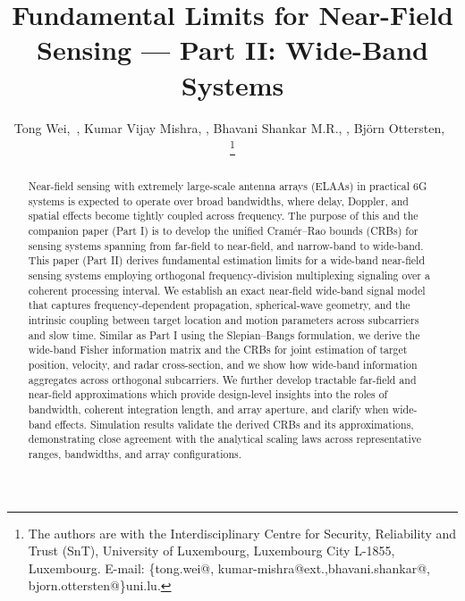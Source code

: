 \documentclass[9pt,final,journal,twocolumn]{IEEEtran}
\begin{document}
\title{Fundamental Limits for Near-Field Sensing --- Part II: Wide-Band Systems}

\author{Tong Wei,~, Kumar Vijay Mishra, , 
Bhavani Shankar M.R., , Björn Ottersten,~


\thanks{The authors are with the Interdisciplinary Centre for Security, Reliability and Trust (SnT), University of Luxembourg, Luxembourg City L-1855, Luxembourg. E-mail: \{tong.wei@, kumar-mishra@ext.,bhavani.shankar@, bjorn.ottersten@\}uni.lu.}
}

\maketitle 

\begin{abstract}
Near-field sensing with extremely large-scale antenna arrays (ELAAs) in practical 6G systems is expected to operate over broad bandwidths, where delay, Doppler, and spatial effects become tightly coupled across frequency. The purpose of this and the companion paper (Part I) is to develop the unified Cramér–Rao bounds (CRBs) for sensing systems spanning from far-field to near-field, and narrow-band to wide-band. This paper (Part II) derives fundamental estimation limits for a wide-band near-field sensing systems employing orthogonal frequency-division multiplexing signaling over a coherent processing interval. We establish an exact near-field wide-band signal model that captures frequency-dependent propagation, spherical-wave geometry, and the intrinsic coupling between target location and motion parameters across subcarriers and slow time. Similar as Part I using the Slepian–Bangs formulation, we derive the wide-band Fisher information matrix and the CRBs for joint estimation of target position, velocity, and radar cross-section, and we show how wide-band information aggregates across orthogonal subcarriers. We further develop tractable far-field and near-field approximations which provide design-level insights into the roles of bandwidth, coherent integration length, and array aperture, and clarify when wide-band effects. Simulation results validate the derived CRBs and its approximations, demonstrating close agreement with the analytical scaling laws across representative ranges, bandwidths, and array configurations.
\end{abstract}
\end{document}
